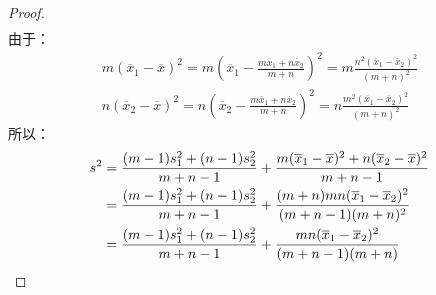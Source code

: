 \begin{proof}
\begin{align*}
	\end{align*}
	由于：
	\begin{gather*}
		m(\overline{x}_1-\overline{x})^2=m\left(\overline{x}_1-\frac{m\overline{x}_1+n\overline{x}_2}{m+n}\right)^2=m\frac{n^2(\overline{x}_1-\overline{x}_2)^2}{(m+n)^2} \\
		n(\overline{x}_2-\overline{x})^2=n\left(\overline{x}_2-\frac{m\overline{x}_1+n\overline{x}_2}{m+n}\right)^2=n\frac{m^2(\overline{x}_1-\overline{x}_2)^2}{(m+n)^2}
	\end{gather*}
	所以：
	\begin{align*}
		s^2&=\frac{(m-1)s_1^2+(n-1)s_2^2}{m+n-1}+\frac{m(\overline{x}_1-\overline{x})^2+n(\overline{x}_2-\overline{x})^2}{m+n-1} \\
		&=\frac{(m-1)s_1^2+(n-1)s_2^2}{m+n-1}+\frac{(m+n)mn(\overline{x}_1-\overline{x}_2)^2}{(m+n-1)(m+n)^2} \\
		&=\frac{(m-1)s_1^2+(n-1)s_2^2}{m+n-1}+\frac{mn(\overline{x}_1-\overline{x}_2)^2}{(m+n-1)(m+n)}\qedhere
	\end{align*}
\end{proof}